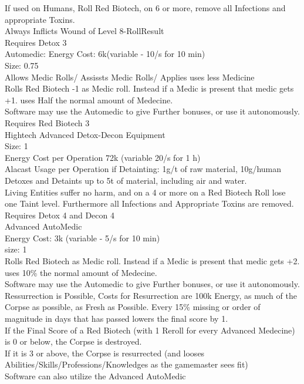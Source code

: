 \documentclass{article}
\begin{document}
    If used on Humans, Roll Red Biotech, on 6 or more, remove all Infections and appropriate Toxins.\\
    Always Inflicts Wound of Level 8-RollResult\\
    Requires Detox 3\\
    \newline
    Automedic:
    Energy Cost: 6k(variable - 10/s for 10 min)\\
    Size: 0.75\\
    Allows Medic Rolls/ Assissts Medic Rolls/ Applies uses less Medicine\\
    Rolls Red Biotech -1 as Medic roll. Instead if a Medic is present that medic gets +1. uses Half the normal amount of Medecine.\\
    Software may use the Automedic to give Further bonuses, or use it autonomously.\\
    Requires Red Biotech 3\\
    \newline
    Hightech\newline
    Advanced Detox-Decon Equipment \\
    Size: 1\\
    Energy Cost per Operation 72k (variable 20/s for 1 h)\\
    Alacast Usage per Operation if Detainting: 1g/t of raw material, 10g/human\\
    Detoxes and Detaints up to 5t of material, including air and water.\\
    Living Entities suffer no harm, and on a 4 or more on a Red Biotech Roll lose one Taint level.
    Furthermore all Infections and Appropriate Toxins are removed.\\
    Requires Detox 4 and Decon 4\\
    \newline
    Advanced AutoMedic\\
    Energy Cost: 3k (variable - 5/s for 10 min)\\
    size: 1\\
    Rolls Red Biotech as Medic roll. Instead if a Medic is present that medic gets +2. uses 10\% the normal amount of Medecine.\\
    Software may use the Automedic to give Further bonuses, or use it autonomously.\\
    Ressurrection is Possible, Costs for Resurrection are 100k Energy, as much of the Corpse as possible, as Fresh as Possible.
    Every 15\% missing or order of magnitude in days that has passed lowers the final score by 1. \\
    If the Final Score of a Red Biotech (with 1 Reroll for every Advanced Medecine) is 0 or below, the Corpse is destroyed.\\
    If it is 3 or above, the Corpse is resurrected (and looses Abilities/Skills/Professions/Knowledges as the gamemaster sees fit)\\
    Software can also utilize the Advanced AutoMedic\\
    \newline
\end{document}
